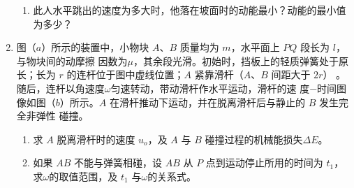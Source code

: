 \begin{enumerate}
\begin{enumerate}
\item 
此人水平跳出的速度为多大时，他落在坡面时的动能最小？动能的最小值为多少？



\end{enumerate}
\begin{figure}[h!]
\flushright

\end{figure}






\newpage
\item
{}
图（$ a $）所示的装置中，小物块 $ A $、$ B $ 质量均为 $ m $，水平面上 $ PQ $ 段长为 $ l $，与物块间的动摩擦
因数为$ \mu $，其余段光滑。初始时，挡板上的轻质弹簧处于原长；长为 $ r $ 的连杆位于图中虚线位置；$ A $
紧靠滑杆（$ A $、$ B $ 间距大于 $ 2r $）
。随后，连杆以角速度$ \omega $匀速转动，带动滑杆作水平运动，滑杆的速
度$ - $时间图像如图（$ b $）所示。$ A $ 在滑杆推动下运动，并在脱离滑杆后与静止的 $ B $ 发生完全非弹性
碰撞。
\begin{enumerate}
\renewcommand{\labelenumi}{\arabic{enumi}.}
\item
求 $ A $ 脱离滑杆时的速度 $ u_o $，及 $ A $ 与 $ B $ 碰撞过程的机械能损失$ \Delta E $。


\item 
如果 $ AB $ 不能与弹簧相碰，设 $ AB $ 从 $ P $ 点到运动停止所用的时间为 $ t_{1} $，求$ \omega $的取值范围，及 $ t_{1} $
与$ \omega $的关系式。


\end{enumerate}
\end{enumerate}
